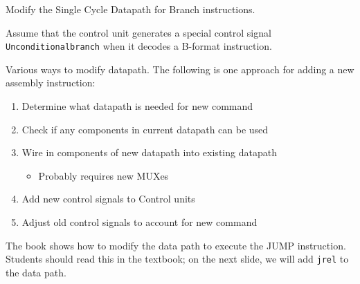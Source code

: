 \begin{frame}[fragile]
\begin{tcolorbox}[enhanced,attach boxed title to top center={yshift=-3mm,yshifttext=-1mm},
  colback=red!5!white,colframe=red!75!black,colbacktitle=red!80!black,
  title=Try this,fonttitle=\bfseries,
  boxed title style={size=small,colframe=red!50!black} ]
Modify the Single Cycle Datapath for Branch instructions. 

Assume that the control unit generates a special control signal \texttt{Unconditionalbranch} when it decodes a B-format instruction. 
  \end{tcolorbox}
 Various ways to modify datapath.  The following is one
		approach for adding a new assembly instruction:
	\begin{enumerate}
	\item Determine what datapath is needed for new command
	\item Check if any components in current datapath can be used
	\item Wire in components of new datapath into existing datapath
\begin{itemize}
    \item Probably requires new MUXes
\end{itemize}
		
	\item Add new control signals to Control units
	\item Adjust old control signals to account for new command
	\end{enumerate}
\BNotes\ifnum{}
The book shows how to modify the data path to execute the JUMP instruction.
Students should read this in the textbook; on the next slide, we will add
{\tt jrel} to the data path.
\fi\ENotes
\end{frame}

